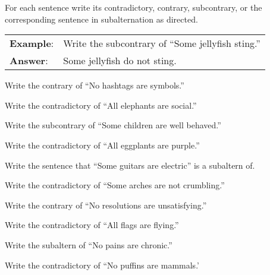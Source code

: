 \noindent \problempart For each sentence write its contradictory, contrary, subcontrary, or the corresponding sentence in subalternation as directed.

\begin{longtabu}{p{.1\linewidth}p{.9\linewidth}}
\textbf{Example}: & Write the subcontrary of ``Some jellyfish sting.''\\
\textbf{Answer}: & Some jellyfish do not sting.\\
\end{longtabu}


\begin{exercises}
\item Write the contrary of ``No hashtags are symbols.'' 

\item Write the contradictory of ``All elephants are social.'' 

\item Write the subcontrary of ``Some children are well behaved.'' 

\item Write the contradictory of ``All eggplants are purple.'' 

\item Write the sentence that ``Some guitars are electric'' is a subaltern of.  

 \item Write the contradictory of  ``Some arches are not crumbling.'' 

\item Write the contrary of ``No resolutions are unsatisfying.'' 

 \item Write the contradictory of  ``All flags are flying.'' 

\item Write the subaltern of ``No pains are chronic.'' 

\item Write the contradictory of  ``No puffins are mammals.'
\end{exercises}


